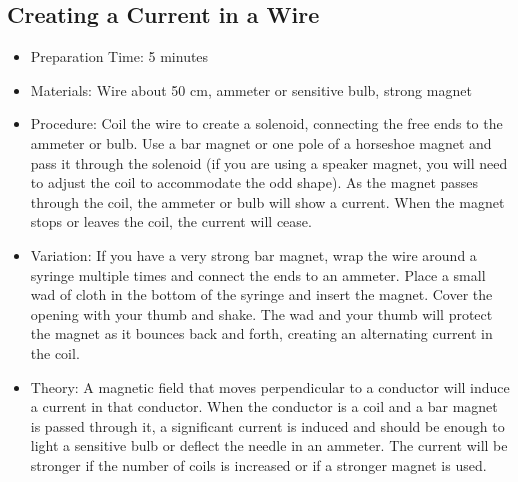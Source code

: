 \subsection{Creating a Current in a Wire}
\begin{itemize}
\item{Preparation Time: 5 minutes}
\item{Materials: Wire about 50 cm, ammeter or sensitive bulb, strong magnet}
\item{Procedure: Coil the wire to create a solenoid, connecting the free ends to the ammeter or bulb. Use a bar magnet or one pole of a horseshoe magnet and pass it through the solenoid (if you are using a speaker magnet, you will need to adjust the coil to accommodate the odd shape). As the magnet passes through the coil, the ammeter or bulb will show a current. When the magnet stops or leaves the coil, the current will cease.}
\item{Variation: If you have a very strong bar magnet, wrap the wire around a syringe multiple times and connect the ends to an ammeter. Place a small wad of cloth in the bottom of the syringe and insert the magnet. Cover the opening with your thumb and shake. The wad and your thumb will protect the magnet as it bounces back and forth, creating an alternating current in the coil.}
\item{Theory: A magnetic field that moves perpendicular to a conductor will induce a current in that conductor. When the conductor is a coil and a bar magnet is passed through it, a significant current is induced and should be enough to light a sensitive bulb or deflect the needle in an ammeter. The current will be stronger if the number of coils is increased or if a stronger magnet is used.}
\end{itemize}

	
	
	
